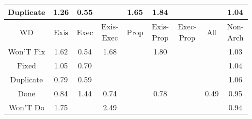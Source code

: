 \begin{tabular}{|c||c|c|c|c|c|c|c|c|}
\hline
Duplicate & \cellcolor[rgb]{0.8854955830516711,0.8283926446034231,0.42} 1.26 & \cellcolor[rgb]{0.8303858262703896,0.46315957767984434,0.34569343785236367} 0.55 &  & \cellcolor[rgb]{0.8486848606524852,0.8109559866248613,0.42} 1.65 & \cellcolor[rgb]{0.8305177915321998,0.8023505328310421,0.42000000000000004} 1.84 &  &  & \cellcolor[rgb]{0.9062844584173723,0.8382400066187552,0.42} 1.04 \\ 
\hline
\hline
WD & Exis & Exec & Exis-Exec & Prop & Exis-Prop & Exec-Prop & All & Non-Arch \\ 
\hline
Won'T Fix & \cellcolor[rgb]{0.8515953895726549,0.8123346582186259,0.41999999999999993} 1.62 & \cellcolor[rgb]{0.8285332130328011,0.4543905416885919,0.34396433216394773} 0.54 & \cellcolor[rgb]{0.8455510020632233,0.8094715272931057,0.42} 1.68 &  & \cellcolor[rgb]{0.8344986320903593,0.804236194148065,0.42} 1.80 &  &  & \cellcolor[rgb]{0.9073682019739305,0.8387533588297565,0.42} 1.03 \\ 
\hline
Fixed & \cellcolor[rgb]{0.9055977673198812,0.8379147318883646,0.42} 1.05 & \cellcolor[rgb]{0.8581535622521175,0.5945935279933561,0.37160999143530965} 0.70 &  &  &  &  &  & \cellcolor[rgb]{0.9064640119178237,0.8383250582768638,0.42} 1.04 \\ 
\hline
Duplicate & \cellcolor[rgb]{0.8737559716371635,0.668444932415907,0.3861722401946859} 0.79 & \cellcolor[rgb]{0.8382933820687344,0.5005886751253428,0.35307382326415215} 0.59 &  &  &  &  &  & \cellcolor[rgb]{0.9041550177574474,0.8372313242008961,0.42} 1.06 \\ 
\hline
Done & \cellcolor[rgb]{0.8810856710746989,0.703138843086908,0.39301329300305227} 0.84 & \cellcolor[rgb]{0.8687746815198538,0.820472217562036,0.42000000000000004} 1.44 & \cellcolor[rgb]{0.865176585093268,0.6278358361081351,0.3781648127537168} 0.74 &  & \cellcolor[rgb]{0.8708312550258827,0.6546012737891777,0.38344250469082375} 0.78 &  & \cellcolor[rgb]{0.8204925669365393,0.416331483499619,0.33645972914076994} 0.49 & \cellcolor[rgb]{0.9013012866756466,0.7988260902647271,0.4118812008972701} 0.95 \\ 
\hline
Won'T Do & \cellcolor[rgb]{0.8393145703586617,0.8065174280646292,0.42} 1.75 &  & \cellcolor[rgb]{0.7698952404262582,0.7736345875703329,0.42} 2.49 &  &  &  &  & \cellcolor[rgb]{0.8999435458569791,0.792399450389701,0.4106139761331805} 0.94 \\ 
\hline
\end{tabular}